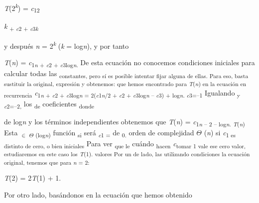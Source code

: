 \documentclass[12pt]{article}
\renewcommand{\_}{\kern-1.5pt\textunderscore\kern-1.5pt}
\begin{document}
{\fontsize{10pt}{12.0pt}\selectfont \textit{T}(2\textit{\textsuperscript{k}}) = \textit{c}\textsubscript{12}{\fontsize{7pt}{8.4pt}\selectfont \textit{k }\textsubscript{+ \textit{c}2 + \textit{c}3\textit{k }}{\fontsize{10pt}{12.0pt}\selectfont y después \textit{n }= 2\textit{\textsuperscript{k }}(\textit{k }= log\textit{n}), y por tanto \par}\par}\par}\par

{\fontsize{10pt}{12.0pt}\selectfont \textit{T}(\textit{n}) = \textit{c}\textsubscript{1\textit{n }+ \textit{c}2 + \textit{c}3log\textit{n}. }De esta ecuación no conocemos condiciones iniciales para calcular todas las \textsubscript{constantes, pero sí es posible intentar fijar alguna de ellas. Para eso, basta sustituir la original, expresión y obtenemos: que hemos encontrado para \textit{T}(\textit{n}) en la ecuación en recurrencia }\textit{c}\textsubscript{1\textit{n }+ \textit{c}2 + \textit{c}3log\textit{n }= 2(\textit{c}1\textit{n}/2 + \textit{c}2 + \textit{c}3log\textit{n }– \textit{c}3) + log\textit{n}. \textit{c}3=–1 }Igualando \textsubscript{y \textit{c}2=–2, }los \textsubscript{de }coeficientes \textsubscript{donde }\par}\par

{\fontsize{10pt}{12.0pt}\selectfont de log\textit{n }y los términos independientes obtenemos que \textit{T}(\textit{n}) = \textit{c}\textsubscript{1\textit{n }– 2 – log\textit{n}. \textit{T}(\textit{n}) }Esta \textsubscript{$ \in $ $ \Theta $ (log\textit{n}) }función \textsubscript{si }será \textit{\textsubscript{c}}\textsubscript{1 = }de \textsubscript{0. }orden de complejidad $ \Theta $ (\textit{n}) si \textit{c}\textsubscript{1 es distinto de cero, o bien iniciales }Para ver \textsubscript{que le }cuándo \textsubscript{hacen }\textit{c}\textsubscript{tomar 1 vale ese cero valor, estudiaremos en este caso los \textit{T}(1). valores Por un de lado, las utilizando condiciones la ecuación original, tenemos que para \textit{n }= 2: }\par}\par

{\fontsize{10pt}{12.0pt}\selectfont \textit{T}(2) = 2\textit{T}(1) + 1. \par}\par

{\fontsize{10pt}{12.0pt}\selectfont Por otro lado, basándonos en la ecuación que hemos obtenido \par}\par
\end{document}
